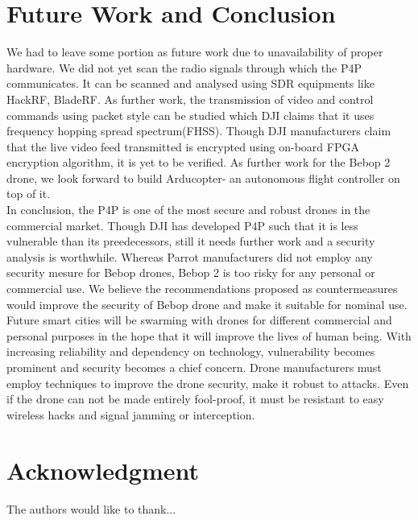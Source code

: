 \documentclass[conference]{IEEEtran}
\begin{document}
\section{Future Work and Conclusion}
We had to leave some portion as future work due to unavailability of proper hardware.  
We did not yet scan the radio signals through which the P4P communicates. It can be scanned and analysed using SDR equipments like HackRF, BladeRF. As further work, the transmission of video and control commands using packet style can be studied which DJI claims that it uses frequency hopping spread spectrum(FHSS). Though DJI manufacturers claim that the live video feed transmitted is encrypted using on-board FPGA encryption algorithm, it is yet to be verified. 
As further work for the Bebop 2 drone, we look forward to build Arducopter- an autonomous flight controller on top of it. \\
In conclusion, the P4P is one of the most secure and robust drones in the commercial market. Though DJI has developed P4P such that it is less vulnerable than its preedecessors, still it needs further work and a security analysis is worthwhile. Whereas Parrot manufacturers did not employ any security mesure for Bebop drones, Bebop 2 is too risky for any personal or commercial use. We believe the recommendations proposed as countermeasures would improve the security of Bebop drone and make it suitable for nominal use.\\
Future smart cities will be swarming with drones for different commercial and personal purposes in the hope that it will improve the lives of human being. 
With increasing reliability and dependency on technology, vulnerability becomes prominent and security becomes a chief concern. Drone manufacturers must employ techniques to improve the drone security, make it robust to attacks. Even if the drone can not be made entirely fool-proof, it must be resistant to easy wireless hacks and signal jamming or interception. \\


\section*{Acknowledgment}


The authors would like to thank...





\end{document}
